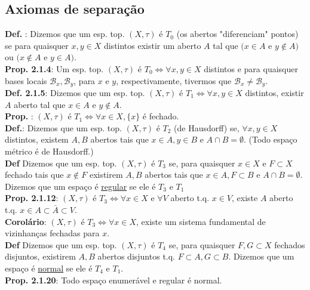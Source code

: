 \documentclass{article}
\begin{document}
\begin{landscape}
\begin{center}
\section{Axiomas de separação}
\end{center}
\begin{multicols}{3}    
\textbf{Def. }: Dizemos que um esp. top. $(X, \tau)$ é $T_0$ (os abertos "diferenciam" pontos) se para quaisquer $x,y\in X$ distintos existir um aberto $A$ tal que $(x \in A$ e $y \notin A)$ ou $(x\notin A$ e $y\in A)$.\\
\textbf{Prop. 2.1.4}: Um esp. top. $(X, \tau)$ é $T_0 \iff \forall x,y \in X$ distintos e para quaisquer bases locais $\mathcal{B}_x, \mathcal{B}_y$, para $x$ e $y$, respectivamente, tivermos que $\mathcal{B}_x \neq \mathcal{B}_y$.\\
\textbf{Def. 2.1.5}: Dizemos que um esp. top. $(X, \tau)$ é $T_1 \iff \forall x,y \in X$ distintos, existir $A$ aberto tal que $x \in A$ e $y \notin A$.\\
\textbf{Prop. }: $(X, \tau)$ é $T_1 \iff \forall x \in X, \{x\}$ é fechado.\\
\textbf{Def.}: Dizemos que um esp. top. $(X, \tau)$ é $T_2$ (de Hausdorff) se, $\forall x,y \in X$ distintos, existem $A,B$ abertos tais que $x \in A, y\in B$ e $A\cap B = \emptyset$. (Todo espaço métrico é de Hausdorff.)\\
\textbf{Def} Dizemos que um esp. top. $(X, \tau)$ é $T_3$ se, para quaisquer $x \in X$ e $F \subset X$ fechado tais que $x \notin F$ existirem $A,B$ abertos tais que $x \in A, F \subset B$ e $A \cap B = \emptyset$. Dizemos que um espaço é \underline{regular} se ele é $T_3$ e $T_1$\\
\textbf{Prop. 2.1.12}: $(X, \tau)$ é $T_3 \iff \forall x\in X$ e $\forall V$ aberto t.q. $x \in V$, existe $A$ aberto t.q. $x \in A \subset \bar{A} \subset V$.\\
\textbf{Corolário}: $(X, \tau)$ é $T_3 \iff \forall x \in X$, existe um sistema fundamental de vizinhanças fechadas para $x$.\\ 
\textbf{Def} Dizemos que um esp. top. $(X, \tau)$ é $T_4$ se, para quaisquer $F,G\subset X$ fechados disjuntos, existirem $A,B$ abertos disjuntos t.q. $F\subset A, G \subset B$.
Dizemos que um espaço é \underline{normal} se ele é $T_4$ e $T_1$.\\
\textbf{Prop. 2.1.20}: Todo espaço enumerável e regular é normal.
\end{multicols}
\begin{center}
    

\end{center}
\end{landscape}
\end{document}
